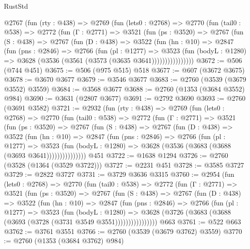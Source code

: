 \begin{lexlean}{RustStd}
\begin{coremodule}
    @2767
      (fun (rty : @438) =>
      @2769
        (fun (lets0 : @2768) =>
        @2770
          (fun (tail0 : @538) =>
          @2772
            (fun (Γ : @2771) =>
            @3521
              (fun (ps : @3520) =>
              @2767
                (fun (S : @438) =>
                @2767
                  (fun (D : @438) =>
                  @3522
                    (fun (hn : @10) =>
                    @2847
                      (fun (pns : @2846) =>
                      @2766
                        (fun (pl : @1277) =>
                        @3523
                          (fun (bodyL : @1280) =>
                          @3628 (@3536 (@3561 (@3573 (@3635 @3641))))))))))))))))
@3672 := @506 (@744 @451)
@3675 := @506 (@975 @515) @518
@3677 := @607 (@3672 @3675)
@3678 := @3670 @3677
@3679 := @3546 @3677
@3683 := @2760 (@3539 (@3679 @3552) @3559)
@3684 := @3568 @3677
@3688 := @2760 (@1353 (@3684 @3552) @984)
@3690 := @3631 (@2807 @3677)
@3691 := @2792 @3690
@3693 := @2760 (@3691 @3582)
@3721 := @2932
    (fun (rty : @438) =>
    @2769
      (fun (lets0 : @2768) =>
      @2770
        (fun (tail0 : @538) =>
        @2772
          (fun (Γ : @2771) =>
          @3521
            (fun (ps : @3520) =>
            @2767
              (fun (S : @438) =>
              @2767
                (fun (D : @438) =>
                @3522
                  (fun (hn : @10) =>
                  @2847
                    (fun (pns : @2846) =>
                    @2766
                      (fun (pl : @1277) =>
                      @3523
                        (fun (bodyL : @1280) =>
                        @3628 (@3536 (@3683 (@3688 (@3693 @3641)))))))))))))))
    @451
@3722 := @1638 @1294
@3726 := @2760 (@3528 (@1364 (@3529 @3722)))
@3727 := @2231 @451
@3728 := @3585 @3727
@3729 := @2822 @3727
@3731 := @3729 @3636 @3315
@3760 := @2954
    (fun (lets0 : @2768) =>
    @2770
      (fun (tail0 : @538) =>
      @2772
        (fun (Γ : @2771) =>
        @3521
          (fun (ps : @3520) =>
          @2767
            (fun (S : @438) =>
            @2767
              (fun (D : @438) =>
              @3522
                (fun (hn : @10) =>
                @2847
                  (fun (pns : @2846) =>
                  @2766
                    (fun (pl : @1277) =>
                    @3523
                      (fun (bodyL : @1280) =>
                      @3628 (@3726 (@3683 (@3688 (@3693 (@3728 (@3731 @3549 @3551))))))))))))))))
    @663
@3761 := @522 @663
@3762 := @3761 @3551
@3766 := @2760 (@3539 (@3679 @3762) @3559)
@3770 := @2760 (@1353 (@3684 @3762) @984)

\end{coremodule}
\end{lexlean}
